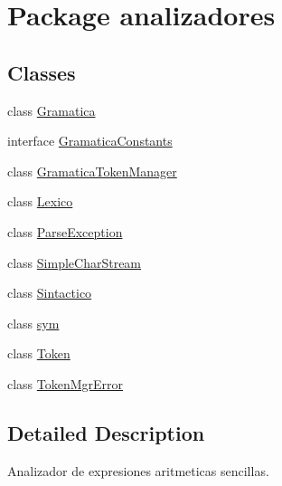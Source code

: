 \hypertarget{namespaceanalizadores}{}\section{Package analizadores}
\label{namespaceanalizadores}
\subsection*{Classes}
\begin{DoxyCompactItemize}
\item 
class \mbox{\hyperlink{classanalizadores_1_1_gramatica}{Gramatica}}
\item 
interface \mbox{\hyperlink{interfaceanalizadores_1_1_gramatica_constants}{Gramatica\+Constants}}
\item 
class \mbox{\hyperlink{classanalizadores_1_1_gramatica_token_manager}{Gramatica\+Token\+Manager}}
\item 
class \mbox{\hyperlink{classanalizadores_1_1_lexico}{Lexico}}
\item 
class \mbox{\hyperlink{classanalizadores_1_1_parse_exception}{Parse\+Exception}}
\item 
class \mbox{\hyperlink{classanalizadores_1_1_simple_char_stream}{Simple\+Char\+Stream}}
\item 
class \mbox{\hyperlink{classanalizadores_1_1_sintactico}{Sintactico}}
\item 
class \mbox{\hyperlink{classanalizadores_1_1sym}{sym}}
\item 
class \mbox{\hyperlink{classanalizadores_1_1_token}{Token}}
\item 
class \mbox{\hyperlink{classanalizadores_1_1_token_mgr_error}{Token\+Mgr\+Error}}
\end{DoxyCompactItemize}


\subsection{Detailed Description}
Analizador de expresiones aritmeticas sencillas. 